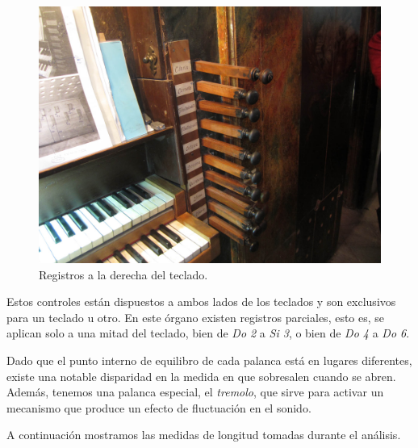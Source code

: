 \begin{figure}[H]
	\noindent \begin{centering}
		\includegraphics[width=\linewidth*2/3]{capitulo3/registros}
		\par\end{centering}
	\smallskip
	\caption{\label{fig:registros} Registros a la derecha del teclado.}
\end{figure} 

\smallskip

Estos controles están dispuestos a ambos lados de los teclados y son exclusivos para un teclado u otro. En este órgano existen registros parciales, esto es, se aplican solo a una mitad del teclado, bien de \textit{Do 2} a \textit{Si 3}, o bien de \textit{Do 4} a \textit{Do 6}.

Dado que el punto interno de equilibro de cada palanca está en lugares diferentes, existe una notable disparidad en la medida en que sobresalen cuando se abren. Además, tenemos una palanca especial, el \textit{tremolo}, que sirve para activar un mecanismo que produce un efecto de fluctuación en el sonido.

A continuación mostramos las medidas de longitud tomadas durante el análisis.

\smallskip

